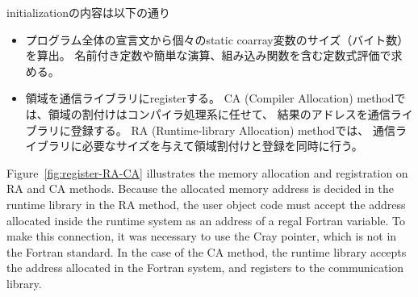 initializationの内容は以下の通り
\begin{itemize}
\item
プログラム全体の宣言文から個々のstatic coarray変数のサイズ（バイト数）を算出。
名前付き定数や簡単な演算、組み込み関数を含む定数式評価で求める。
\item
領域を通信ライブラリにregisterする。
CA (Compiler Allocation) methodでは、領域の割付けはコンパイラ処理系に任せて、
結果のアドレスを通信ライブラリに登録する。
RA (Runtime-library Allocation) methodでは、
通信ライブラリに必要なサイズを与えて領域割付けと登録を同時に行う。
\end{itemize}

Figure~\ref{fig:register-RA-CA} illustrates the memory allocation and registration
on RA and CA methods. 
Because the allocated memory address is decided in the runtime library in the RA
method, the user object code must accept the address allocated 
inside the runtime system as an address of a regal Fortran variable.
To make this connection, it was necessary to use the Cray pointer, which is not 
in the Fortran standard.
In the case of the CA method, the runtime library accepts the address allocated
in the Fortran system, and registers to the communication library.

